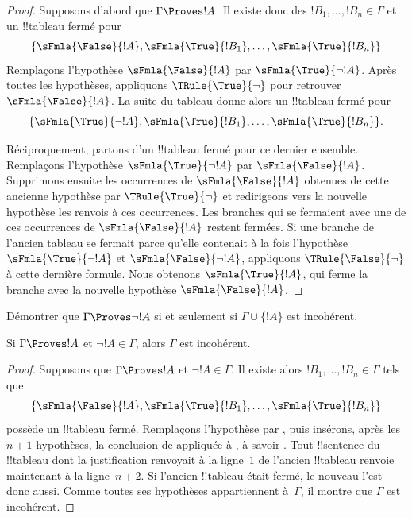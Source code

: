 \documentclass[../../../include/open-logic-section]{subfiles}
\begin{document}
\begin{proof}
Supposons d'abord que $\Gamma \Proves !A$. Il existe donc des
$!B_1,\dots,!B_n \in \Gamma$ et un !!{tableau} fermé pour
\[
\{\sFmla{\False}{!A},
\sFmla{\True}{!B_1}, \dots, \sFmla{\True}{!B_n}\}
\]
Remplaçons l'hypothèse $\sFmla{\False}{!A}$ par
$\sFmla{\True}{\lnot !A}$. Après toutes les hypothèses, appliquons
$\TRule{\True}{\lnot}$ pour retrouver $\sFmla{\False}{!A}$.
La suite du tableau donne alors un !!{tableau} fermé pour
\[
\{\sFmla{\True}{\lnot !A},
\sFmla{\True}{!B_1}, \dots, \sFmla{\True}{!B_n}\}.
\]

Réciproquement, partons d'un !!{tableau} fermé pour ce dernier
ensemble. Remplaçons l'hypothèse $\sFmla{\True}{\lnot !A}$ par
$\sFmla{\False}{!A}$. Supprimons ensuite les occurrences de
$\sFmla{\False}{!A}$ obtenues de cette ancienne hypothèse par
$\TRule{\True}{\lnot}$ et redirigeons vers la nouvelle hypothèse
les renvois à ces occurrences. Les branches qui se fermaient avec
une de ces occurrences de $\sFmla{\False}{!A}$ restent fermées.
Si une branche de l'ancien tableau se
%
fermait parce qu'elle contenait à la fois l'hypothèse
$\sFmla{\True}{\lnot !A}$ et $\sFmla{\False}{\lnot !A}$, appliquons
$\TRule{\False}{\lnot}$ à cette dernière formule. Nous obtenons
$\sFmla{\True}{!A}$, qui ferme la branche avec la nouvelle hypothèse
$\sFmla{\False}{!A}$.
\end{proof}

\begin{prob}
Démontrer que $\Gamma \Proves \lnot !A$ si et seulement si
$\Gamma \cup \{!A\}$ est incohérent.
\end{prob}

\begin{prop}
  Si $\Gamma \Proves !A$ et $\lnot !A \in \Gamma$, alors
  $\Gamma$ est incohérent.
\end{prop}

\begin{proof}
  Supposons que $\Gamma \Proves !A$ et $\lnot !A \in \Gamma$.
  Il existe alors $!B_1, \dots, !B_n \in \Gamma$ tels que
  \[
  \{\sFmla{\False}{!A}, \sFmla{\True}{!B_1}, \dots, \sFmla{\True}{!B_n}\}
  \]
  possède un !!{tableau} fermé. Remplaçons l'hypothèse
   par , puis insérons,
  après les $n+1$ hypothèses, la conclusion de
  \TRule{\True}{\lnot} appliquée à , à savoir
  . Tout !!{sentence} du !!{tableau} dont la
  justification renvoyait à la ligne~$1$ de l'ancien !!{tableau}
  renvoie maintenant à la ligne~$n+2$. Si l'ancien !!{tableau} était
  fermé, le nouveau l'est donc aussi. Comme toutes ses hypothèses
  appartiennent à~$\Gamma$, il montre que $\Gamma$ est incohérent.
\end{proof}
\end{document}
